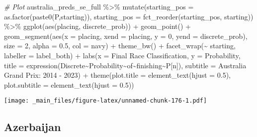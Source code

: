 \documentclass[
]{book}
\newenvironment{Shaded}{\begin{snugshade}}{\end{snugshade}}
\newcommand{\AttributeTok}[1]{\textcolor[rgb]{0.77,0.63,0.00}{#1}}
\newcommand{\CommentTok}[1]{\textcolor[rgb]{0.56,0.35,0.01}{\textit{#1}}}
\newcommand{\DecValTok}[1]{\textcolor[rgb]{0.00,0.00,0.81}{#1}}
\newcommand{\FloatTok}[1]{\textcolor[rgb]{0.00,0.00,0.81}{#1}}
\newcommand{\FunctionTok}[1]{\textcolor[rgb]{0.00,0.00,0.00}{#1}}
\newcommand{\NormalTok}[1]{#1}
\newcommand{\SpecialCharTok}[1]{\textcolor[rgb]{0.00,0.00,0.00}{#1}}
\newcommand{\StringTok}[1]{\textcolor[rgb]{0.31,0.60,0.02}{#1}}
\begin{document}
\begin{Shaded}
\begin{Highlighting}[]
\CommentTok{\# Plot}
\NormalTok{australia\_preds\_se\_full }\SpecialCharTok{\%\textgreater{}\%}
  \FunctionTok{mutate}\NormalTok{(}\AttributeTok{starting\_pos =} \FunctionTok{as.factor}\NormalTok{(}\FunctionTok{paste0}\NormalTok{(}\StringTok{\textquotesingle{}P\textquotesingle{}}\NormalTok{,starting)),}
         \AttributeTok{starting\_pos =} \FunctionTok{fct\_reorder}\NormalTok{(starting\_pos, starting)) }\SpecialCharTok{\%\textgreater{}\%}
  \FunctionTok{ggplot}\NormalTok{(}\FunctionTok{aes}\NormalTok{(placing, discrete\_prob)) }\SpecialCharTok{+}
  \FunctionTok{geom\_point}\NormalTok{() }\SpecialCharTok{+}
  \FunctionTok{geom\_segment}\NormalTok{(}\FunctionTok{aes}\NormalTok{(}\AttributeTok{x =}\NormalTok{ placing, }\AttributeTok{xend =}\NormalTok{ placing, }\AttributeTok{y =} \DecValTok{0}\NormalTok{, }\AttributeTok{yend =}\NormalTok{ discrete\_prob),}
               \AttributeTok{size =} \DecValTok{2}\NormalTok{, }\AttributeTok{alpha =} \FloatTok{0.5}\NormalTok{, }\AttributeTok{col =} \StringTok{\textquotesingle{}navy\textquotesingle{}}\NormalTok{) }\SpecialCharTok{+}
  \FunctionTok{theme\_bw}\NormalTok{() }\SpecialCharTok{+}
  \FunctionTok{facet\_wrap}\NormalTok{(}\SpecialCharTok{\textasciitilde{}}\NormalTok{ starting, }\AttributeTok{labeller =}\NormalTok{ label\_both) }\SpecialCharTok{+}
  \FunctionTok{labs}\NormalTok{(}\AttributeTok{x =} \StringTok{\textquotesingle{}Final Race Classification\textquotesingle{}}\NormalTok{,}
       \AttributeTok{y =} \StringTok{\textquotesingle{}Probability\textquotesingle{}}\NormalTok{,}
       \AttributeTok{title =} \FunctionTok{expression}\NormalTok{(Discrete}\SpecialCharTok{\textasciitilde{}}\NormalTok{Probability}\SpecialCharTok{\textasciitilde{}}\NormalTok{of}\SpecialCharTok{\textasciitilde{}}\NormalTok{finishing}\SpecialCharTok{\textasciitilde{}}\NormalTok{P[n]),}
       \AttributeTok{subtitle =} \StringTok{\textquotesingle{}Australia Grand Prix: 2014 {-} 2023\textquotesingle{}}\NormalTok{) }\SpecialCharTok{+}
  \FunctionTok{theme}\NormalTok{(}\AttributeTok{plot.title =} \FunctionTok{element\_text}\NormalTok{(}\AttributeTok{hjust =} \FloatTok{0.5}\NormalTok{),}
        \AttributeTok{plot.subtitle =} \FunctionTok{element\_text}\NormalTok{(}\AttributeTok{hjust =} \FloatTok{0.5}\NormalTok{)) }
\end{Highlighting}
\end{Shaded}

\texttt{[image: \_main\_files/figure-latex/unnamed-chunk-176-1.pdf]}

\hypertarget{azerbaijan}{%
\subsection{Azerbaijan}\label{azerbaijan}}
\end{document}
